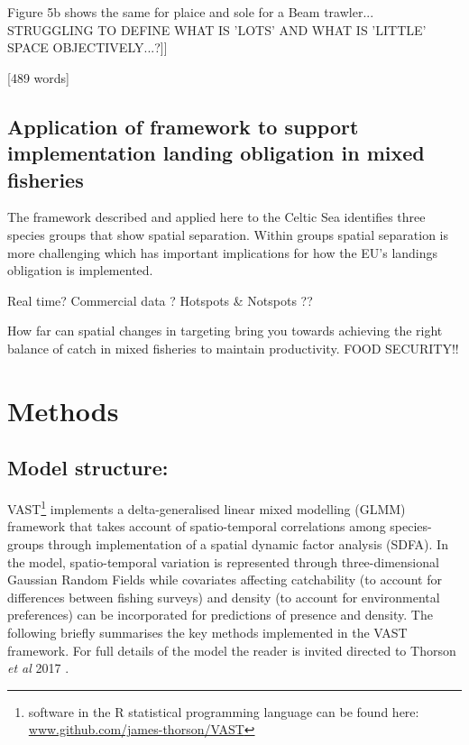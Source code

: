 \documentclass{nature}
\begin{document}
\begin{linenumbers}
Figure 5b shows the same for plaice and sole for a Beam trawler...
STRUGGLING TO DEFINE WHAT IS 'LOTS' AND WHAT IS 'LITTLE' SPACE
OBJECTIVELY...?]]

[489 words]

\subsection{Application of framework to support implementation landing
	obligation in mixed fisheries}
The framework described and applied here to the Celtic Sea identifies three
species groups that show spatial separation. Within groups spatial separation
is more challenging which has important implications for how the EU's landings
obligation is implemented.


Real time?  Commercial data ?  Hotspots \& Notspots ??

How far can spatial changes in targeting bring you towards achieving the right
balance of catch in mixed fisheries to maintain productivity. FOOD SECURITY!!

\section*{Methods}

\subsection{Model structure:} 

VAST\footnote{software in the R statistical programming language can be found
	here: \url{www.github.com/james-thorson/VAST}} implements a
delta-generalised linear mixed modelling (GLMM) framework that takes account of
spatio-temporal correlations among species-groups through implementation of a
spatial dynamic factor analysis (SDFA).  In the model, spatio-temporal
variation is represented through three-dimensional Gaussian Random Fields while
covariates affecting catchability (to account for differences between fishing
surveys) and density (to account for environmental preferences) can be
incorporated for predictions of presence and density. The following briefly
summarises the key methods implemented in the VAST framework. For full details
of the model the reader is invited directed to Thorson \textit{et al} 2017
\cite{Thorson2017}.


\end{linenumbers}
\end{document}
